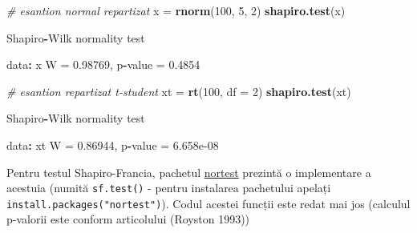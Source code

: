 \documentclass[]{article}
\newenvironment{Shaded}{\begin{snugshade}}{\end{snugshade}}
\newcommand{\KeywordTok}[1]{\textcolor[rgb]{0.13,0.29,0.53}{\textbf{#1}}}
\newcommand{\DataTypeTok}[1]{\textcolor[rgb]{0.13,0.29,0.53}{#1}}
\newcommand{\DecValTok}[1]{\textcolor[rgb]{0.00,0.00,0.81}{#1}}
\newcommand{\FloatTok}[1]{\textcolor[rgb]{0.00,0.00,0.81}{#1}}
\newcommand{\StringTok}[1]{\textcolor[rgb]{0.31,0.60,0.02}{#1}}
\newcommand{\CommentTok}[1]{\textcolor[rgb]{0.56,0.35,0.01}{\textit{#1}}}
\newcommand{\OperatorTok}[1]{\textcolor[rgb]{0.81,0.36,0.00}{\textbf{#1}}}
\newcommand{\NormalTok}[1]{#1}
\begin{document}
\begin{Shaded}
\begin{Highlighting}[]
\CommentTok{# esantion normal repartizat }
\NormalTok{x =}\StringTok{ }\KeywordTok{rnorm}\NormalTok{(}\DecValTok{100}\NormalTok{, }\DecValTok{5}\NormalTok{, }\DecValTok{2}\NormalTok{)}
\KeywordTok{shapiro.test}\NormalTok{(x)}

\NormalTok{    Shapiro}\OperatorTok{-}\NormalTok{Wilk normality test}

\NormalTok{data}\OperatorTok{:}\StringTok{  }\NormalTok{x}
\NormalTok{W =}\StringTok{ }\FloatTok{0.98769}\NormalTok{, p}\OperatorTok{-}\NormalTok{value =}\StringTok{ }\FloatTok{0.4854}

\CommentTok{# esantion repartizat t-student}
\NormalTok{xt =}\StringTok{ }\KeywordTok{rt}\NormalTok{(}\DecValTok{100}\NormalTok{, }\DataTypeTok{df =} \DecValTok{2}\NormalTok{)}
\KeywordTok{shapiro.test}\NormalTok{(xt)}

\NormalTok{    Shapiro}\OperatorTok{-}\NormalTok{Wilk normality test}

\NormalTok{data}\OperatorTok{:}\StringTok{  }\NormalTok{xt}
\NormalTok{W =}\StringTok{ }\FloatTok{0.86944}\NormalTok{, p}\OperatorTok{-}\NormalTok{value =}\StringTok{ }\FloatTok{6.658e-08}
\end{Highlighting}
\end{Shaded}

Pentru testul Shapiro-Francia, pachetul
\href{https://cran.r-project.org/web/packages/nortest/}{nortest}
prezintă o implementare a acestuia (numită \texttt{sf.test()} - pentru
instalarea pachetului apelați \texttt{install.packages("nortest")}).
Codul acestei funcții este redat mai jos (calculul p-valorii este
conform articolului (Royston 1993))
\end{document}
